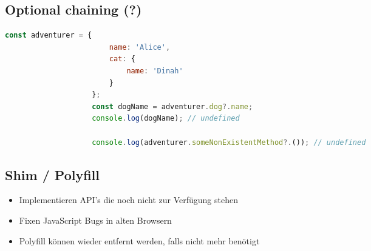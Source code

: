 \documentclass[a4paper, landscape, 8pt]{scrartcl}
\begin{document}
\begin{multicols*}{4}
        \subsection{Optional chaining (?)}
        \begin{lstlisting}[language=JavaScript]
                    const adventurer = {
                        name: 'Alice',
                        cat: {
                            name: 'Dinah'
                        }
                    };
                    const dogName = adventurer.dog?.name;
                    console.log(dogName); // undefined

                    console.log(adventurer.someNonExistentMethod?.()); // undefined
        \end{lstlisting}

        \subsection{Shim / Polyfill}
        \begin{itemize}
            \item Implementieren API's die noch nicht zur Verfügung stehen
            \item Fixen JavaScript Bugs in alten Browsern
            \item Polyfill können wieder entfernt werden, falls nicht mehr benötigt
        \end{itemize}

    \end{multicols*}
\end{document}
